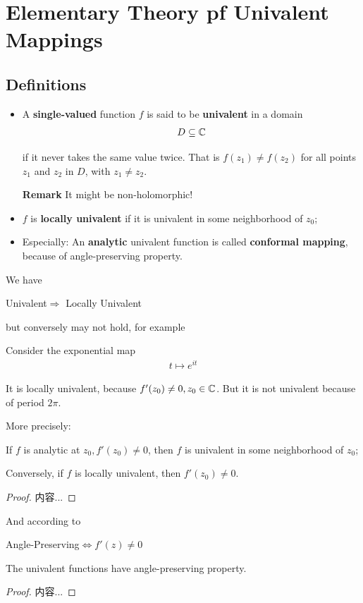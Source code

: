 \documentclass[Total.tex]{subfiles}
\begin{document}
	\chapter{Elementary Theory pf Univalent Mappings}
		\section{Definitions}
			\begin{Def}
				\begin{itemize}
					\item A \textbf{single-valued} function $f$ is said to be \textbf{univalent} in a domain 
					\begin{gather*}
						D\subseteq \mathbb{C}
					\end{gather*}
					
					if it never takes the same value twice. That is $f(z_1)\not=f(z_2)$ for all points $z_1$ and $z_2$ in $D$, with $z_1\not=z_2$.
					
					\textbf{Remark} It might be non-holomorphic!
					
					
					\item $f$ is \textbf{locally univalent} if it is univalent in some neighborhood of $z_0$;
					
					\item Especially: An \textbf{analytic} univalent function is called \textbf{conformal mapping}, because of angle-preserving property.
				\end{itemize}
			\end{Def}
			
			We have
			\begin{center}
				Univalent$\Rightarrow$ Locally Univalent
			\end{center}
			
			but conversely may not hold, for example
			\begin{example}
				Consider the exponential map
				\begin{gather*}
					t\mapsto e^{it}
				\end{gather*}
				
				It is locally univalent, because $f'(z_0)\not=0,z_0\in \mathbb{C}$. But it is not univalent because of period $2\pi$.
			\end{example}
			
			More precisely:
			\begin{proposition}
				If $f$ is analytic at $z_0,f'(z_0)\not=0$, then $f$ is univalent in some neighborhood of $z_0$;
				
				Conversely, if $f$ is locally univalent, then $f'(z_0)\not=0$.
			\end{proposition}
			
			\begin{proof}
				内容...
			\end{proof}
			
			And according to
			\begin{center}
				Angle-Preserving$\Leftrightarrow f'(z)\not=0$ 
			\end{center}
			
			\begin{corollary}
				The univalent functions have angle-preserving property.
			\end{corollary}
			\begin{proof}
				内容...
			\end{proof}
\end{document}
